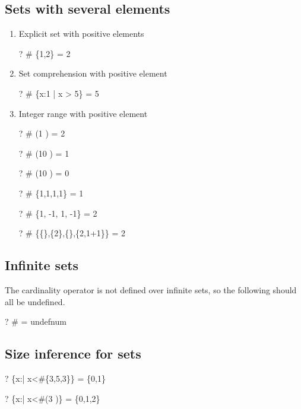 \documentclass{article}
\newcommand{\negate}{-}
\begin{document}
\subsection{Sets with several elements}
\begin{enumerate}
\item Explicit set with positive elements
\begin{zed} \vdash?  \# \{1,2\} = 2 \end{zed}
\item Set comprehension with positive element
\begin{zed} \vdash?  \# \{x:1  | x > 5\} = 5 \end{zed}
\item Integer range with positive element
\begin{zed} \vdash?  \# (1 ) = 2 \end{zed}
\begin{zed} \vdash?  \# (10 ) = 1 \end{zed}
\begin{zed} \vdash?  \# (10 ) = 0 \end{zed}
\begin{zed} \vdash?  \# \{1,1,1,1\} = 1 \end{zed}
\begin{zed} \vdash?  \# \{1, \negate 1, 1, \negate 1\} = 2 \end{zed}
\begin{zed} \vdash?  \# \{\{\},\{2\},\{\},\{2,1+1\}\} = 2 \end{zed}
\end{enumerate}

\subsection{Infinite sets}
The cardinality operator is not defined over infinite sets,
so the following should all be undefined.
\begin{zed} \vdash?  \# \nat = undefnum \end{zed}

\subsection{Size inference for sets}
\begin{zed} \vdash?  \{x:\nat | x<\#\{3,5,3\}\} = \{0,1\} \end{zed}
\begin{zed} \vdash?  \{x:\nat | x<\#(3 )\} = \{0,1,2\} \end{zed}
\end{document}
